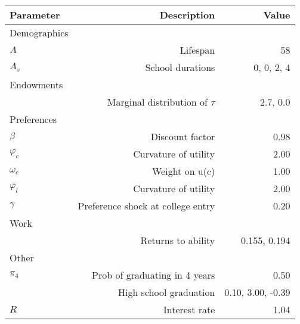 \begin{tabular}{lrr}
\hline
Parameter & Description  & Value  \\ 
\hline
Demographics &   &   \\ 
$A$ & Lifespan  & 58  \\ 
$A_{s}$ & School durations  & 0, 0, 2, 4  \\ 
Endowments &   &   \\ 
 & Marginal distribution of $\tau$  & 2.7, 0.0  \\ 
Preferences &   &   \\ 
$\beta$ & Discount factor  & 0.98  \\ 
$\varphi_{c}$ & Curvature of utility  & 2.00  \\ 
$\omega_{c}$ & Weight on u(c)  & 1.00  \\ 
$\varphi_{l}$ & Curvature of utility  & 2.00  \\ 
$\gamma$ & Preference shock at college entry  & 0.20  \\ 
Work &   &   \\ 
 & Returns to ability  & 0.155, 0.194  \\ 
Other &   &   \\ 
$\pi_{4}$ & Prob of graduating in 4 years  & 0.50  \\ 
 & High school graduation  & 0.10, 3.00, -0.39  \\ 
$R$ & Interest rate  & 1.04  \\ 
\hline
\end{tabular}%
